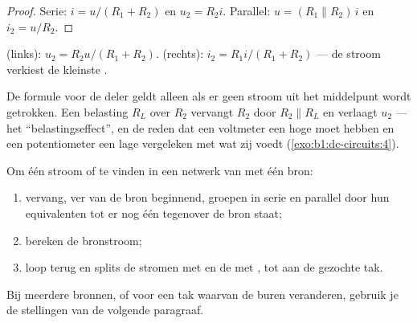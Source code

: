 \begin{proof}
Serie: $i = u/(R_1 + R_2)$ en $u_2 = R_2 i$. Parallel: $u = (R_1
\parallel R_2)\,i$ en $i_2 = u/R_2$.
\end{proof}

\begin{omfigure}

{\small {} (links): $u_2 = R_2 u/(R_1 + R_2)$. 
(rechts): $i_2 = R_1 i/(R_1 + R_2)$ --- de stroom verkiest de
kleinste .}
\end{omfigure}

\begin{remark}\label{rem:b1:dc-circuits:loading}
De formule voor de deler geldt alleen als er geen stroom uit het middelpunt
wordt getrokken. Een belasting $R_L$ over $R_2$ vervangt $R_2$ door $R_2
\parallel R_L$ en verlaagt $u_2$ --- het ``belastingseffect'', en de
reden dat een voltmeter een hoge  moet hebben en een potentiometer
een lage vergeleken met wat zij voedt
(\cref{exo:b1:dc-circuits:4}).
\end{remark}

\begin{method}\label{met:b1:dc-circuits:reduce}
Om één stroom of  te vinden in een netwerk van  met één
bron:
\begin{enumerate}
  \item vervang, ver van de bron beginnend, groepen in serie en parallel
        door hun equivalenten tot er nog één  tegenover de bron
        staat;
  \item bereken de bronstroom;
  \item loop terug en splits de stromen met  en de
         met , tot aan de gezochte tak.
\end{enumerate}
Bij meerdere bronnen, of voor een tak waarvan de buren veranderen, gebruik je
de stellingen van de volgende paragraaf.
\end{method}

